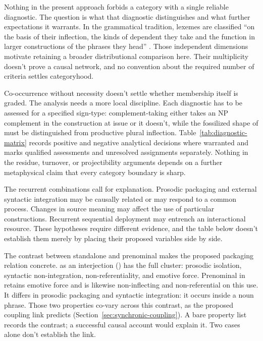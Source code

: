 \documentclass[12pt]{article}
\begin{document}
Nothing in the present approach forbids a category with a single reliable diagnostic. The question is what that diagnostic distinguishes and what further expectations it warrants. In the grammatical tradition, lexemes are classified \enquote{on the basis of their inflection, the kinds of dependent they take and the function in larger constructions of the phrases they head} \citep[30]{HuddlestonPullum2002}. Those independent dimensions motivate retaining a broader distributional comparison here. Their multiplicity doesn't prove a causal network, and no convention about the required number of criteria settles categoryhood.

Co-occurrence without necessity doesn't settle whether membership itself is graded. The analysis needs a more local discipline. Each diagnostic has to be assessed for a specified sign-type: complement-taking  either takes an NP complement in the construction at issue or it doesn't, while the fossilized shape of  must be distinguished from productive plural inflection. Table~\ref{tab:diagnostic-matrix} records positive and negative analytical decisions where warranted and marks qualified assessments and unresolved assignments separately. Nothing in the residue, turnover, or projectibility arguments depends on a further metaphysical claim that every category boundary is sharp.

The recurrent combinations call for explanation. Prosodic packaging and external syntactic integration may be causally related or may respond to a common process. Changes in source meaning may affect the use of particular constructions. Recurrent sequential deployment may entrench an interactional resource. These hypotheses require different evidence, and the table below doesn't establish them merely by placing their proposed variables side by side.

The contrast between standalone and prenominal  makes the proposed packaging relation concrete.  as an interjection () has the full cluster: prosodic isolation, syntactic non-integration, non-referentiality, and emotive force. Prenominal  in  retains emotive force \citep[cf.][171, 182]{potts2007} and is likewise non-inflecting and non-referential on this use. It differs in prosodic packaging and syntactic integration: it occurs inside a noun phrase. Those two properties co-vary across this contrast, as the proposed coupling link predicts (Section~\ref{sec:synchronic-coupling}). A bare property list records the contrast; a successful causal account would explain it. Two cases alone don't establish the link.
\end{document}
